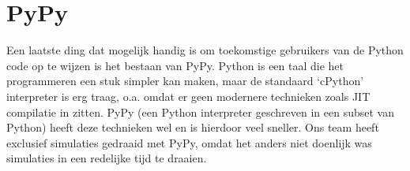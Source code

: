 \documentclass[a4paper]{article}
\begin{document}
\section{PyPy}
Een laatste ding dat mogelijk handig is om toekomstige gebruikers van de Python code op te wijzen is het bestaan van PyPy. Python is een taal die het programmeren een stuk simpler kan maken, maar de standaard `cPython' interpreter is erg traag, o.a. omdat er geen modernere technieken zoals JIT compilatie in zitten. PyPy (een Python interpreter geschreven in een subset van Python) heeft deze technieken wel en is hierdoor veel sneller. Ons team heeft exclusief simulaties gedraaid met PyPy, omdat het anders niet doenlijk was simulaties in een redelijke tijd te draaien. 
\end{document}
